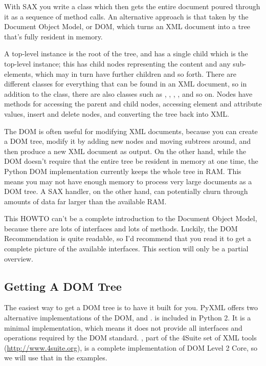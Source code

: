 \documentclass{howto}
\begin{document}
With SAX you write a class which then gets the entire document poured
through it as a sequence of method calls.  An alternative approach is
that taken by the Document Object Model, or DOM, which turns an XML
document into a tree that's fully resident in memory.  

A top-level  instance is the root of the tree, and has
a single child which is the top-level  instance; this
 has child nodes representing the content and any
sub-elements, which may in turn have further children and so forth.
There are different classes for everything that can be found in an XML
document, so in addition to the  class, there are also
classes such as , , ,
, and so on.  Nodes have methods for
accessing the parent and child nodes, accessing element and attribute
values, insert and delete nodes, and converting the tree back into XML.

The DOM is often useful for modifying XML documents, because you can
create a DOM tree, modify it by adding new nodes and moving subtrees
around, and then produce a new XML document as output.  On the other
hand, while the DOM doesn't require that the entire tree be resident
in memory at one time, the Python DOM implementation currently keeps
the whole tree in RAM.  This means you may not have enough memory to
process very large documents as a DOM tree.  A SAX handler, on the
other hand, can potentially churn through amounts of data far larger
than the available RAM.

This HOWTO can't be a complete introduction to the Document Object
Model, because there are lots of interfaces and lots of
methods. Luckily, the DOM Recommendation is quite readable, so I'd
recommend that you read it to get a complete picture of the available
interfaces.  This section will only be a partial overview.


\subsection{Getting A DOM Tree}

The easiest way to get a DOM tree is to have it built for you. PyXML
offers two alternative implementations of the DOM,
 and .  is
included in Python 2. It is a minimal implementation, which means it
does not provide all interfaces and operations required by the DOM
standard.  , part of the 4Suite set of XML tools
(\url{http://www.4suite.org}), is a complete implementation of
DOM Level 2 Core, so we will use that in the examples.
\end{document}
